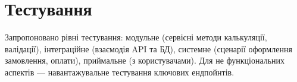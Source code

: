 \section{Тестування}
Запропоновано рівні тестування: модульне (сервісні методи калькуляції, валідації), інтеграційне (взаємодія API та БД), системне (сценарії оформлення замовлення, оплати), приймальне (з користувачами). Для не функціональних аспектів — навантажувальне тестування ключових ендпойнтів.

